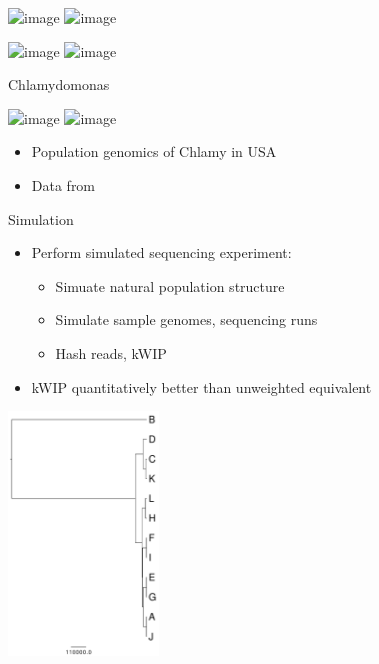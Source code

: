 \documentclass[t]{beamer}
\begin{document}
\begin{frame}
  \begin{center}
    \includegraphics<1>[width=\textwidth]{img/distmat-both.png}
    \includegraphics<2>[width=\textwidth]{img/dendro-both.png}
  \end{center}
\end{frame}

\begin{frame}
  \begin{center}
    \includegraphics<1>[width=0.6\textwidth]{img/dendro-wip.png}
    \includegraphics<2>[width=0.6\textwidth]{img/dendro-ip.png}
  \end{center}
\end{frame}

\begin{frame}{Chlamydomonas}
  \begin{center}
    \includegraphics<1>[width=0.6\textwidth]{img/chlamydomonas_PCA_from_paper.png}
    \includegraphics<2>[width=0.6\textwidth]{img/chlamydomonas_PCA_full-set-dim_1-3.png}
    \begin{itemize}
      \item Population genomics of Chlamy in USA
      \item[] \tiny{Data from \textcite{flowers_whole-genome_2015}}
    \end{itemize}
  \end{center}
\end{frame}

\begin{frame}{Simulation}
  \begin{itemize}
    \item Perform simulated sequencing experiment:
    \begin{itemize}
      \item Simuate natural population structure
      \item Simulate sample genomes, sequencing runs
      \item Hash reads, kWIP
    \end{itemize}
    \item kWIP quantitatively better than unweighted equivalent
  \end{itemize}
  \begin{center}
    \includegraphics[width=0.3\textwidth]{img/sampletree.pdf}
  \end{center}
\end{frame}
\end{document}
